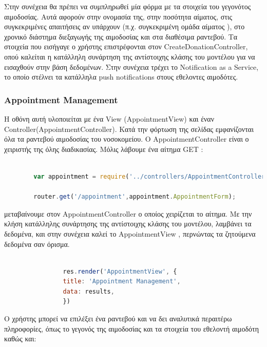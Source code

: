 	Στην συνέχεια θα πρέπει να συμπληρωθεί μία φόρμα με τα στοιχεία του γεγονότος αιμοδοσίας. Αυτά αφορούν στην ονομασία της, στην ποσότητα αίματος, στις συγκεκριμένες απαιτήσεις αν υπάρχουν (π.χ. συγκεκριμένη ομάδα αίματος ), στο χρονικό διάστημα διεξαγωγής της αιμοδοσίας και στα διαθέσιμα ραντεβού. Τα στοιχεία που εισήγαγε ο χρήστης επιστρέφονται στον CreateDonationController, οπού καλείται η κατάλληλη συνάρτηση της αντίστοιχης κλάσης του μοντέλου για να εισαχθούν στην βάση δεδομένων. Στην συνέχεια τρέχει το Notification as a Service, το οποίο στέλνει τα κατάλληλα push notifications στους εθελοντες αιμοδότες.
		
		
		
		
						\subsubsection{Appointment Management}
		
	Η οθόνη αυτή υλοποιείται με ένα View (AppointmentView) και έναν Controller(AppointmentController). Κατά την φόρτωση της σελίδας εμφανίζονται όλα τα ραντεβού αιμοδοσίας του νοσοκομείου. O AppointmentController είναι ο χειριστής της όλης διαδικασίας. Μόλις λάβουμε ένα αίτημα GET :
		
		\begin{lstlisting}[language=Javascript]			
		
		var appointment = require('../controllers/AppointmentController');
		
		router.get('/appointment',appointment.AppointmentForm);  


		\end{lstlisting}
		
μεταβαίνουμε στον AppointmentController ο οποίος χειρίζεται το αίτημα. Με την κλήση κατάλληλης συνάρτησης της αντίστοιχης κλάσης του μοντέλου, λαμβάνει τα δεδομένα,  και στην συνέχεια καλεί το AppointmentView , περνώντας τα ζητούμενα δεδομένα σαν όρισμα.



		\begin{lstlisting}[language=Javascript]			
		
	            res.render('AppointmentView', { 
                title: 'Appointment Management',
                data: results,
				})

		\end{lstlisting}
		
		Ο χρήστης μπορεί να επιλέξει ένα ραντεβού και να δει αναλυτικά περαιτέρω πληροφορίες, όπως το γεγονός της αιμοδοσίας και  τα στοιχεία του εθελοντή αιμοδότη καθώς και:
		
